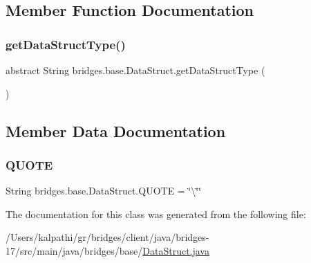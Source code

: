 \subsection{Member Function Documentation}
\mbox{\label{classbridges_1_1base_1_1_data_struct_a3bae9d0d68a85e517a34be482e90fdd4}} 
\subsubsection{\texorpdfstring{get\+Data\+Struct\+Type()}{getDataStructType()}}
{\footnotesize\ttfamily abstract String bridges.\+base.\+Data\+Struct.\+get\+Data\+Struct\+Type (\begin{DoxyParamCaption}{ }\end{DoxyParamCaption})\hspace{0.3cm}{\ttfamily [abstract]}}



\subsection{Member Data Documentation}
\mbox{\label{classbridges_1_1base_1_1_data_struct_aac4a6ea28f44676274120ba1dddafc1f}} 
\subsubsection{\texorpdfstring{Q\+U\+O\+TE}{QUOTE}}
{\footnotesize\ttfamily String bridges.\+base.\+Data\+Struct.\+Q\+U\+O\+TE = \char`\"{}\textbackslash{}\char`\"{}\char`\"{}\hspace{0.3cm}{\ttfamily [protected]}}



The documentation for this class was generated from the following file\+:\begin{DoxyCompactItemize}
\item 
/\+Users/kalpathi/gr/bridges/client/java/bridges-\/17/src/main/java/bridges/base/\mbox{\hyperlink{_data_struct_8java}{Data\+Struct.\+java}}\end{DoxyCompactItemize}
